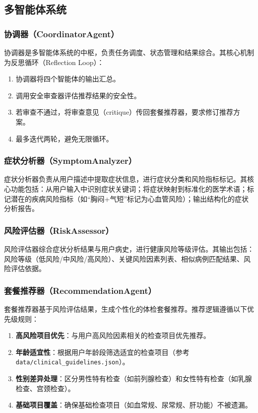 \documentclass[12pt,a4paper]{article}
\begin{document}
\subsection{多智能体系统}

\subsubsection{协调器（CoordinatorAgent）}

协调器是多智能体系统的中枢，负责任务调度、状态管理和结果综合。其核心机制为反思循环（Reflection Loop）：

\begin{enumerate}[leftmargin=2em]
    \item 协调器将四个智能体的输出汇总。
    \item 调用安全审查器评估推荐结果的安全性。
    \item 若审查不通过，将审查意见（critique）传回套餐推荐器，要求修订推荐方案。
    \item 最多迭代两轮，避免无限循环。
\end{enumerate}

\subsubsection{症状分析器（SymptomAnalyzer）}

症状分析器负责从用户描述中提取症状信息，进行症状分类和风险指标标记。其核心功能包括：从用户输入中识别症状关键词；将症状映射到标准化的医学术语；标记潜在的疾病风险指标（如“胸闷+气短”标记为心血管风险）；输出结构化的症状分析报告。

\subsubsection{风险评估器（RiskAssessor）}

风险评估器综合症状分析结果与用户病史，进行健康风险等级评估。其输出包括：风险等级（低风险/中风险/高风险）、关键风险因素列表、相似病例匹配结果、风险评估依据。

\subsubsection{套餐推荐器（RecommendationAgent）}

套餐推荐器基于风险评估结果，生成个性化的体检套餐推荐。推荐逻辑遵循以下优先级规则：

\begin{enumerate}[leftmargin=2em]
    \item \textbf{高风险项目优先}：与用户高风险因素相关的检查项目优先推荐。
    \item \textbf{年龄适宜性}：根据用户年龄段筛选适宜的检查项目（参考 \texttt{data/clinical\_guidelines.json}）。
    \item \textbf{性别差异处理}：区分男性特有检查（如前列腺检查）和女性特有检查（如乳腺检查、宫颈检查）。
    \item \textbf{基础项目覆盖}：确保基础检查项目（如血常规、尿常规、肝功能）不被遗漏。
\end{enumerate}
\end{document}

